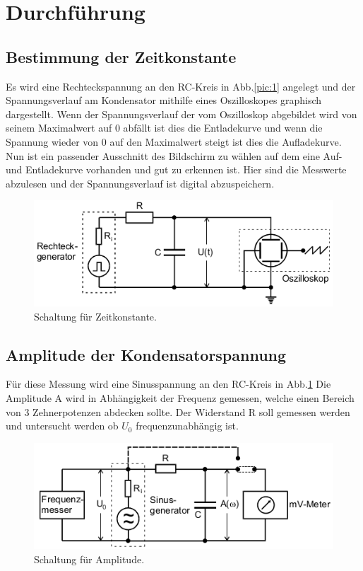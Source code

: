 \section{Durchführung}
\subsection{Bestimmung der Zeitkonstante}
Es wird eine Rechteckspannung an den RC-Kreis in Abb.\ref{pic:1} angelegt und
der Spannungsverlauf am Kondensator mithilfe eines Oszilloskopes
graphisch dargestellt. Wenn der Spannungsverlauf der vom Oszilloskop
abgebildet wird von seinem Maximalwert auf 0 abfällt ist dies die Entladekurve und wenn die Spannung wieder von 0 auf den Maximalwert
steigt ist dies die Aufladekurve.
Nun ist ein passender Ausschnitt des Bildschirm zu wählen auf dem eine Auf- und Entladekurve
vorhanden und gut zu erkennen ist. Hier sind die Messwerte abzulesen und der Spannungsverlauf
ist digital abzuspeichern.

\begin{figure}[H]
  \centering
  \includegraphics{content/images/pic2.png}
  \caption{Schaltung für Zeitkonstante.}
  \label{pic:2}
\end{figure}

\subsection{Amplitude der Kondensatorspannung}
Für diese Messung wird eine Sinusspannung an den RC-Kreis in Abb.\ref{pic:2}
Die Amplitude A wird in Abhängigkeit der Frequenz gemessen, welche einen Bereich
von 3 Zehnerpotenzen abdecken sollte. Der Widerstand R soll gemessen werden und untersucht
werden ob $U_0$ frequenzunabhängig ist.

\begin{figure}[H]
  \centering
  \includegraphics{content/images/pic3.png}
  \caption{Schaltung für Amplitude.}
  \label{pic:3}
\end{figure}


